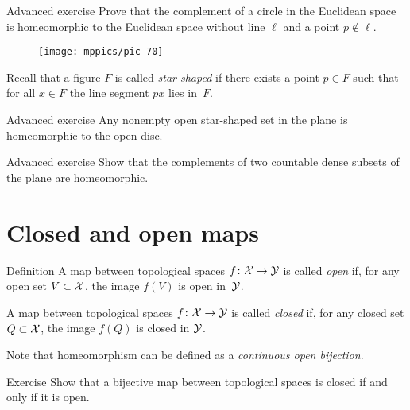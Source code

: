 \begin{thm}{Advanced exercise}\label{ex:inversion}
Prove that the complement of a circle in the Euclidean space is homeomorphic to the Euclidean space without line $\ell$ and a point $p\not\in\ell$.
\end{thm}

\begin{wrapfigure}{r}{34 mm}
\vskip-4mm
\centering
\texttt{[image: mppics/pic-70]}
\end{wrapfigure}

Recall that a figure $F$ is called \emph{star-shaped} if there exists a point $p\in F$ such that for all $x\in F$ the line segment $px$ lies in~$F$.

\begin{thm}{Advanced exercise}\label{ex:star-shaped}
Any nonempty open star-shaped set in the plane is homeomorphic to the open disc.
\end{thm}

\begin{thm}{Advanced exercise}\label{ex:cont-dense}
Show that the complements of two countable dense subsets of the plane are homeomorphic.
\end{thm}


\section{Closed and open maps}
\label{sec:Closed and open maps}

\begin{thm}{Definition}\label{def:open-closed-maps}
A map between topological spaces 
$f\colon\mathcal{X}\to\mathcal{Y}$ is called \emph{open} if, for any open set $V\subset\mathcal{X}$, the image $f(V)$ is open in~$\mathcal{Y}$.

A map between topological spaces 
$f\colon\mathcal{X}\to\mathcal{Y}$ is called \emph{closed} if, for any closed set $Q\subset\mathcal{X}$, the image $f(Q)$ is closed in $\mathcal{Y}$.
\end{thm}

Note that homeomorphism can be defined as a \textit{continuous open bijection}.

\begin{thm}{Exercise}\label{ex:bijective-closed-open}
Show that a bijective map between topological spaces is closed if and only if it is open.
\end{thm}

